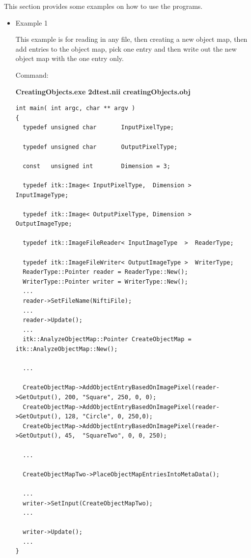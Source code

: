 \documentclass{InsightArticle}
\begin{document}
This section provides some examples on how to use the programs.
\begin{itemize}
\item Example 1 

This example is for reading in any file, then creating a new object map, then add entries to the object map, pick one entry and then write out the new object map with the one entry only.


Command:

\textbf{CreatingObjects.exe 2dtest.nii creatingObjects.obj}\\


\small \begin{verbatim}
int main( int argc, char ** argv )
{
  typedef unsigned char       InputPixelType;

  typedef unsigned char       OutputPixelType;

  const   unsigned int        Dimension = 3;

  typedef itk::Image< InputPixelType,  Dimension >    InputImageType;

  typedef itk::Image< OutputPixelType, Dimension >    OutputImageType;

  typedef itk::ImageFileReader< InputImageType  >  ReaderType;

  typedef itk::ImageFileWriter< OutputImageType >  WriterType;
  ReaderType::Pointer reader = ReaderType::New();
  WriterType::Pointer writer = WriterType::New();
  ...
  reader->SetFileName(NiftiFile);
  ...
  reader->Update();
  ...
  itk::AnalyzeObjectMap::Pointer CreateObjectMap = itk::AnalyzeObjectMap::New();

  ...

  CreateObjectMap->AddObjectEntryBasedOnImagePixel(reader->GetOutput(), 200, "Square", 250, 0, 0);         
  CreateObjectMap->AddObjectEntryBasedOnImagePixel(reader->GetOutput(), 128, "Circle", 0, 250,0);    
  CreateObjectMap->AddObjectEntryBasedOnImagePixel(reader->GetOutput(), 45,  "SquareTwo", 0, 0, 250);

  ...

  CreateObjectMapTwo->PlaceObjectMapEntriesIntoMetaData();

  ...
  writer->SetInput(CreateObjectMapTwo);
  ...

  writer->Update();
  ...
}
\end{verbatim} \normalsize
  


\end{itemize}
\end{document}
